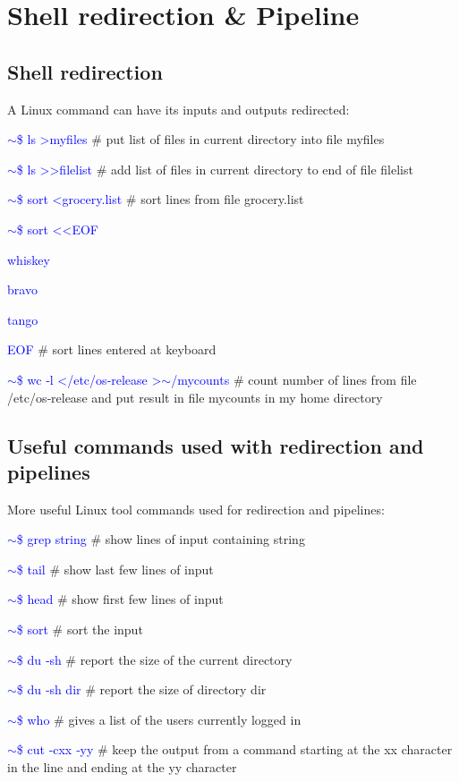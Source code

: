 \documentclass{beamer}[10pt, usepdftitle=false, handout]
\newcommand*{\blue}{\textcolor{blue}}
\begin{document}
	\section{Shell redirection \& Pipeline}
	\subsection{Shell redirection}	
	
	\begin{frame}
	
	A Linux command can have its inputs and outputs redirected:
	\vspace*{1em}
	
	\blue{$\sim$\$ ls >myfiles} \# put list of files in current directory into file myfiles
	
	\blue{$\sim$\$ ls >>filelist} \# add list of files in current directory to end of file filelist
	
	\blue{$\sim$\$ sort <grocery.list} \# sort lines from file grocery.list

	\blue{$\sim$\$ sort <<EOF} 
	
\blue{whiskey}

\blue{bravo}

\blue{tango}

\blue{EOF} \# sort lines entered at keyboard

	\blue{$\sim$\$ wc ‐l </etc/os‐release >$\sim$/mycounts} \# count number of lines from file /etc/os‐release and put result in file mycounts in my home directory
	
		
	\end{frame}
	
	\subsection{Useful commands used with redirection and pipelines}	
	
	\begin{frame}
	
	More useful Linux tool commands used for redirection and pipelines:
	\vspace*{1em}

	\blue{$\sim$\$ grep string} \# show lines of input containing string
	
	\blue{$\sim$\$ tail} \# show last few lines of input
	
	\blue{$\sim$\$ head} \# show first few lines of input
	
	\blue{$\sim$\$ sort} \# sort the input

	\blue{$\sim$\$ du ‐sh} \# report the size of the current directory
	
	\blue{$\sim$\$ du ‐sh dir} \# report the size of directory dir

	\blue{$\sim$\$ who} \# gives a list of the users currently logged in

	\blue{$\sim$\$ cut ‐cxx ‐yy} \# keep the output from a command starting at the xx character in the line and ending
at the yy character
		
	\end{frame}	
	
\end{document}
